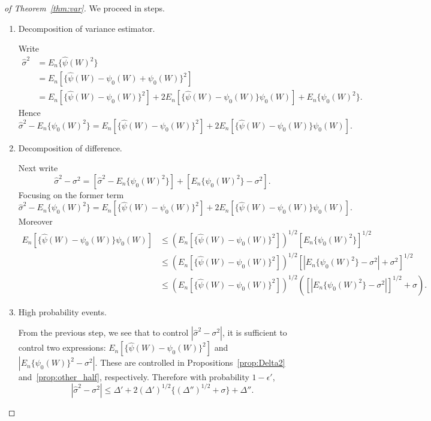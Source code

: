\begin{proof}[of Theorem~\ref{thm:var}]
We proceed in steps.
\begin{enumerate}
    \item Decomposition of variance estimator.
    
    Write
    \begin{align*}
        \hat{\sigma}^2
        &=E_n\{\hat{\psi}(W)^2\}\\
        &=E_n[\{\hat{\psi}(W)-\psi_0(W)+\psi_0(W)\}^2]\\
        &=E_n[\{\hat{\psi}(W)-\psi_0(W)\}^2]+2E_n[\{\hat{\psi}(W)-\psi_0(W)\}\psi_0(W)]+E_n\{\psi_0(W)^2\}.
    \end{align*}
Hence
$$
\hat{\sigma}^2-E_n\{\psi_0(W)^2\}=E_n[\{\hat{\psi}(W)-\psi_0(W)\}^2]+2E_n[\{\hat{\psi}(W)-\psi_0(W)\}\psi_0(W)].
$$
    
    \item Decomposition of difference.
    
    Next write
    $$
\hat{\sigma}^2-\sigma^2=[\hat{\sigma}^2-E_n\{\psi_0(W)^2\}]+[E_n\{\psi_0(W)^2\}-\sigma^2].
$$
Focusing on the former term
$$
\hat{\sigma}^2-E_n\{\psi_0(W)^2\}=E_n[\{\hat{\psi}(W)-\psi_0(W)\}^2]+2E_n[\{\hat{\psi}(W)-\psi_0(W)\}\psi_0(W)].
$$
Moreover
\begin{align*}
    E_n[\{\hat{\psi}(W)-\psi_0(W)\}\psi_0(W)] &\leq \left(E_n[\{\hat{\psi}(W)-\psi_0(W)\}^2]\right)^{1/2}\left[E_n\{\psi_0(W)^2\}\right]^{1/2} \\
    &\leq \left(E_n[\{\hat{\psi}(W)-\psi_0(W)\}^2]\right)^{1/2}\left[|E_n\{\psi_0(W)^2\}-\sigma^2|+\sigma^2\right]^{1/2} \\
    &\leq \left(E_n[\{\hat{\psi}(W)-\psi_0(W)\}^2]\right)^{1/2} \left(\left[|E_n\{\psi_0(W)^2\}-\sigma^2|\right]^{1/2}+\sigma\right).
\end{align*}

\item High probability events.

From the previous step, we see that to control $|\hat{\sigma}^2-\sigma^2|$, it is sufficient to control two expressions:  $E_n[\{\hat{\psi}(W)-\psi_0(W)\}^2]$ and $|E_n\{\psi_0(W)\}^2-\sigma^2|$. These are controlled in Propositions~\ref{prop:Delta2} and~\ref{prop:other_half}, respectively. Therefore with probability $1-\epsilon'$,
$$
|\hat{\sigma}^2-\sigma^2|\leq \Delta'+2(\Delta')^{1/2}\{(\Delta'')^{1/2}+\sigma\}+\Delta''.
$$
    
\end{enumerate}
\end{proof}

